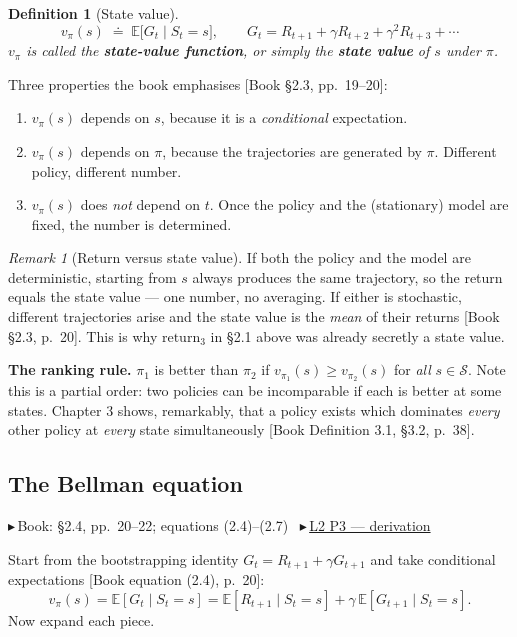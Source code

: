\documentclass[11pt, letterpaper]{article}
\theoremstyle{runin}
\newtheorem*{definition}{Definition}
\theoremstyle{runinplain}
\theoremstyle{remark}
\newtheorem*{remark}{Remark}
\newcommand{\E}{\mathbb{E}}
\newcommand{\Sspace}{\mathcal{S}}
\newcommand{\bk}[1]{{\color{bookblue}\small$\blacktriangleright$\,\textsf{Book: #1}}}
\newcommand{\bkin}[1]{{\color{bookblue}\small[\textsf{Book #1}]}}
\newcommand{\vid}[2]{{\color{vidred}\small$\playbutton$\,\href{#2}{\textsf{#1}}}}
\newcommand{\playbutton}{\blacktriangleright}
\begin{document}
\begin{definition}[State value]
\[
  v_\pi(s) \;\doteq\; \E\bigl[G_t \mid S_t=s\bigr],
  \qquad
  G_t = R_{t+1}+\gamma R_{t+2}+\gamma^2 R_{t+3}+\cdots
\]
$v_\pi$ is called the \textbf{state-value function}, or simply the \textbf{state
value} of $s$ under $\pi$.
\end{definition}

Three properties the book emphasises \bkin{\S2.3, pp.~19--20}:

\begin{enumerate}
  \item $v_\pi(s)$ depends on $s$, because it is a \emph{conditional} expectation.
  \item $v_\pi(s)$ depends on $\pi$, because the trajectories are generated by $\pi$.
        Different policy, different number.
  \item $v_\pi(s)$ does \emph{not} depend on $t$. Once the policy and the
        (stationary) model are fixed, the number is determined.
\end{enumerate}

\begin{remark}[Return versus state value]
If both the policy and the model are deterministic, starting from $s$ always
produces the same trajectory, so the return equals the state value --- one number,
no averaging. If either is stochastic, different trajectories arise and the state
value is the \emph{mean} of their returns \bkin{\S2.3, p.~20}. This is why
$\text{return}_3$ in \S2.1 above was already secretly a state value.
\end{remark}

\textbf{The ranking rule.} $\pi_1$ is better than $\pi_2$ if
$v_{\pi_1}(s)\geq v_{\pi_2}(s)$ for \emph{all} $s\in\Sspace$. Note this is a
partial order: two policies can be incomparable if each is better at some states.
Chapter 3 shows, remarkably, that a policy exists which dominates \emph{every}
other policy at \emph{every} state simultaneously \bkin{Definition 3.1, \S3.2, p.~38}.

\subsection{The Bellman equation}

\bk{\S2.4, pp.~20--22; equations (2.4)--(2.7)}
\ \vid{L2 P3 --- derivation}{https://www.youtube.com/watch?v=eNtId8yPWkA}

Start from the bootstrapping identity $G_t=R_{t+1}+\gamma G_{t+1}$ and take
conditional expectations \bkin{equation (2.4), p.~20}:
\[
  v_\pi(s)=\E[G_t\mid S_t=s]
  =\E[R_{t+1}\mid S_t=s]+\gamma\,\E[G_{t+1}\mid S_t=s].
\]
Now expand each piece.
\end{document}
